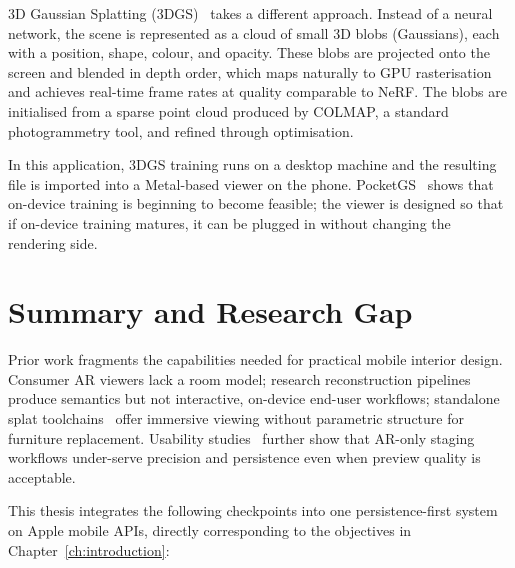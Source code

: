 3D Gaussian Splatting (3DGS)~\cite{kerbl20233dgs} takes a different
approach. Instead of a neural network, the scene is represented as a
cloud of small 3D blobs (Gaussians), each with a position, shape,
colour, and opacity. These blobs are projected onto the screen and
blended in depth order, which maps naturally to GPU rasterisation and
achieves real-time frame rates at quality comparable to NeRF. The blobs
are initialised from a sparse point cloud produced by COLMAP, a standard
photogrammetry tool, and refined through optimisation.

In this application, 3DGS training runs on a desktop machine and the
resulting file is imported into a Metal-based viewer on the phone.
PocketGS~\cite{Guo26} shows that on-device training is beginning to
become feasible; the viewer is designed so that if on-device training
matures, it can be plugged in without changing the rendering side.

\section{Summary and Research Gap}
\label{sec:soa:gap}

Prior work fragments the capabilities needed for practical mobile interior
design. Consumer AR viewers lack a room model; research reconstruction
pipelines~\cite{dai2017scannet} produce semantics but not interactive,
on-device end-user workflows; standalone splat toolchains~\cite{kerbl20233dgs}
offer immersive viewing without parametric structure for furniture replacement.
Usability studies~\cite{kandil2021ux} further show that AR-only staging
workflows under-serve precision and persistence even when preview quality is
acceptable.

This thesis integrates the following checkpoints into one persistence-first
system on Apple mobile APIs, directly corresponding to the objectives in
Chapter~\ref{ch:introduction}:

